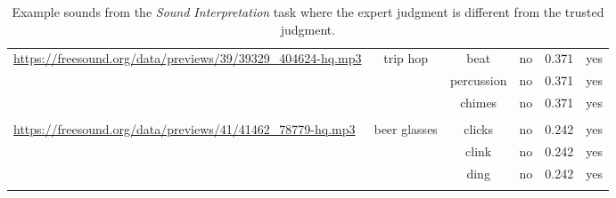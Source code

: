 \begin{table}[!t]
{\begin{tabular}{p{4cm}ccccc}
\multirow{4}{4cm}{\url{https://freesound.org/data/previews/39/39329_404624-hq.mp3}} & \multirow{4}{*}{trip hop} & beat & no & 0.371 & yes \\ \cline{3-6}
& & percussion & no & 0.371 & yes \\ \cline{3-6}
& & chimes & no & 0.371 & yes \\ 
& &  &  & &  \\ \hline

\multirow{4}{4cm}{\url{https://freesound.org/data/previews/41/41462_78779-hq.mp3}} & \multirow{4}{*}{beer glasses} & clicks & no & 0.242 & yes \\ \cline{3-6}
& & clink & no & 0.242 & yes \\ \cline{3-6}
& & ding & no & 0.242 & yes \\
& &  &  & &  \\ %
\bottomrule
\end{tabular}
}

\caption {Example sounds from the \textit{Sound Interpretation} task where the expert judgment is different from the trusted judgment.}
\label{tab:ex_sounds}
\end{table}
